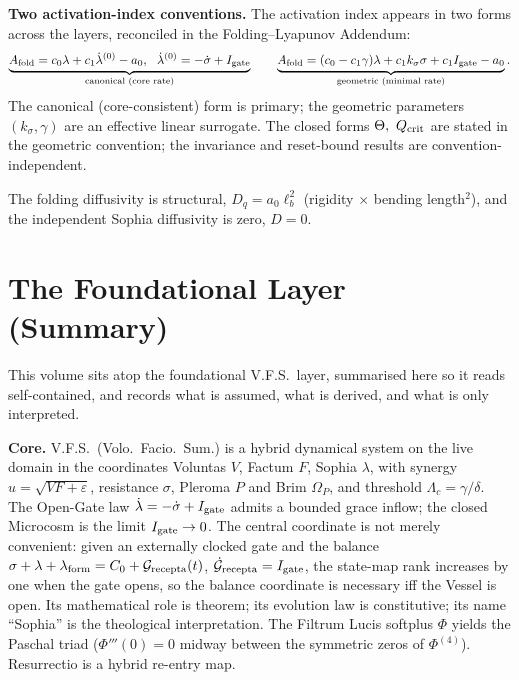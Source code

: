 \documentclass[11pt,a4paper,oneside]{book}
\newcommand{\Op}{\Omega_P}
\theoremstyle{plain}
\theoremstyle{definition}
\theoremstyle{remark}
\begin{document}
\textbf{Two activation-index conventions.} The activation index appears in two forms across the layers,
reconciled in the Folding--Lyapunov Addendum:
\[
\underbrace{A_{\rm fold}=c_0\lambda+c_1\dot\lambda^{(0)}-a_0,\ \ \dot\lambda^{(0)}=-\dot\sigma+I_{\rm gate}}_{\text{canonical (core rate)}}
\qquad
\underbrace{A_{\rm fold}=(c_0-c_1\gamma)\lambda+c_1k_\sigma\sigma+c_1I_{\rm gate}-a_0}_{\text{geometric (minimal rate)}}.
\]
The canonical (core-consistent) form is primary; the geometric parameters $(k_\sigma,\gamma)$ are an
effective linear surrogate. The closed forms $\Theta,\ Q_{\rm crit}$ are stated in the geometric
convention; the invariance and reset-bound results are convention-independent.

The folding diffusivity is structural, $D_q=a_0\ell_b^2$ (rigidity $\times$ bending length$^2$), and the
independent Sophia diffusivity is zero, $D=0$.


\chapter*{The Foundational Layer (Summary)}

This volume sits atop the foundational V.F.S.\ layer, summarised here so it reads self-contained, and
records what is assumed, what is derived, and what is only interpreted.

\textbf{Core.} V.F.S.\ (Volo.\ Facio.\ Sum.) is a hybrid dynamical system on the live domain in the
coordinates Voluntas $V$, Factum $F$, Sophia $\lambda$, with synergy $u=\sqrt{VF+\varepsilon}$, resistance
$\sigma$, Pleroma $P$ and Brim $\Op$, and threshold $\Lambda_c=\gamma/\delta$. The Open-Gate law
$\dot\lambda=-\dot\sigma+I_{\rm gate}$ admits a bounded grace inflow; the closed Microcosm is the limit
$I_{\rm gate}\to0$. The central coordinate is not merely convenient: given an externally clocked gate and
the balance $\sigma+\lambda+\lambda_{\rm form}=C_0+\mathcal{G}_{\rm recepta}(t)$,
$\dot{\mathcal{G}}_{\rm recepta}=I_{\rm gate}$, the state-map rank increases by one when the gate opens, so
the balance coordinate is necessary iff the Vessel is open. Its mathematical role is theorem; its
evolution law is constitutive; its name ``Sophia'' is the theological interpretation. The Filtrum Lucis
softplus $\Phi$ yields the Paschal triad ($\Phi'''(0)=0$ midway between the symmetric zeros of
$\Phi^{(4)}$). Resurrectio is a hybrid re-entry map.
\end{document}
